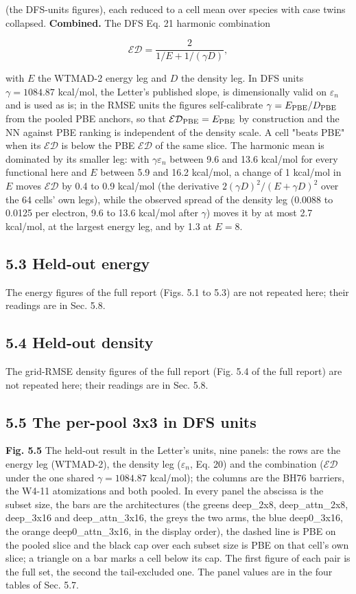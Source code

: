 \documentclass[10pt,a4paper]{article}
\begin{document}
(the DFS-units figures), each reduced to a cell mean over species with case twins collapsed. \textbf{Combined.} The DFS Eq. 21 harmonic combination

\[
\mathcal{ED} = \frac{2}{1/E + 1/(\gamma D)},
\]

with $E$ the WTMAD-2 energy leg and $D$ the density leg. In DFS units $\gamma = 1084.87$ kcal/mol, the Letter's published slope, is dimensionally valid on $\varepsilon_n$ and is used as is; in the RMSE units the figures self-calibrate $\gamma = E_{\rm PBE}/D_{\rm PBE}$ from the pooled PBE anchors, so that $\mathcal{ED}_{\rm PBE} = E_{\rm PBE}$ by construction and the NN against PBE ranking is independent of the density scale. A cell "beats PBE" when its $\mathcal{ED}$ is below the PBE $\mathcal{ED}$ of the same slice. The harmonic mean is dominated by its smaller leg: with $\gamma \varepsilon_n$ between 9.6 and 13.6 kcal/mol for every functional here and $E$ between 5.9 and 16.2 kcal/mol, a change of 1 kcal/mol in $E$ moves $\mathcal{ED}$ by 0.4 to 0.9 kcal/mol (the derivative $2 (\gamma D)^2 / (E + \gamma D)^2$ over the 64 cells' own legs), while the observed spread of the density leg (0.0088 to 0.0125 per electron, 9.6 to 13.6 kcal/mol after $\gamma$) moves it by at most 2.7 kcal/mol, at the largest energy leg, and by 1.3 at $E = 8$.

\subsection*{5.3 Held-out energy}

The energy figures of the full report (Figs. 5.1 to 5.3) are not repeated here; their readings are in Sec. 5.8.

\subsection*{5.4 Held-out density}

The grid-RMSE density figures of the full report (Fig. 5.4 of the full report) are not repeated here; their readings are in Sec. 5.8.

\subsection*{5.5 The per-pool 3x3 in DFS units}

\textbf{Fig. 5.5} The held-out result in the Letter's units, nine panels: the rows are the energy leg (WTMAD-2), the density leg ($\varepsilon_n$, Eq. 20) and the combination ($\mathcal{ED}$ under the one shared $\gamma = 1084.87$ kcal/mol); the columns are the BH76 barriers, the W4-11 atomizations and both pooled. In every panel the abscissa is the subset size, the bars are the architectures (the greens deep\_2x8, deep\_attn\_2x8, deep\_3x16 and deep\_attn\_3x16, the greys the two arms, the blue deep0\_3x16, the orange deep0\_attn\_3x16, in the display order), the dashed line is PBE on the pooled slice and the black cap over each subset size is PBE on that cell's own slice; a triangle on a bar marks a cell below its cap. The first figure of each pair is the full set, the second the tail-excluded one. The panel values are in the four tables of Sec. 5.7.
\end{document}
